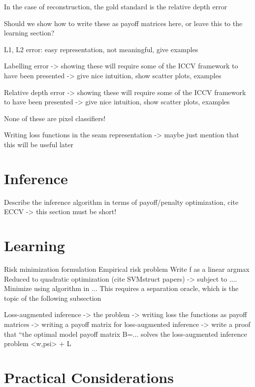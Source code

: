 In the
case of reconstruction, the gold standard is the relative depth error
\cite{Hartley04}


Should we show how to write these as payoff matrices here, or leave
this to the learning section?

L1, L2 error: easy representation, not meaningful, give examples

Labelling error
-> showing these will require some of the ICCV framework to have been presented
-> give nice intuition, show scatter plots, examples

Relative depth error
-> showing these will require some of the ICCV framework to have been presented
-> give nice intuition, show scatter plots, examples

None of these are pixel classifiers!

Writing loss functions in the seam representation -> maybe just
mention that this will be useful later

\section{Inference}
\label{sec:inference}

Describe the inference algorithm in terms of payoff/penalty
optimization, cite ECCV -> this section must be short!

\section{Learning}
\label{sec:learning}

Risk minimization formulation
Empirical risk problem
Write f as a linear argmax
Reduced to quadratic optimization (cite SVMstruct papers)
-> subject to ....
Minimize using algorithm in ...
This requires a separation oracle, which is the topic of the
following subsection

Loss-augmented inference
-> the problem
-> writing loss the functions as payoff matrices
-> writing a payoff matrix for loss-augmented inference
-> write a proof that ``the optimal model payoff matrix
B=... solves the loss-augmented inference problem <w,psi> + L

\section{Practical Considerations}
\label{sec:practical-considerations}

